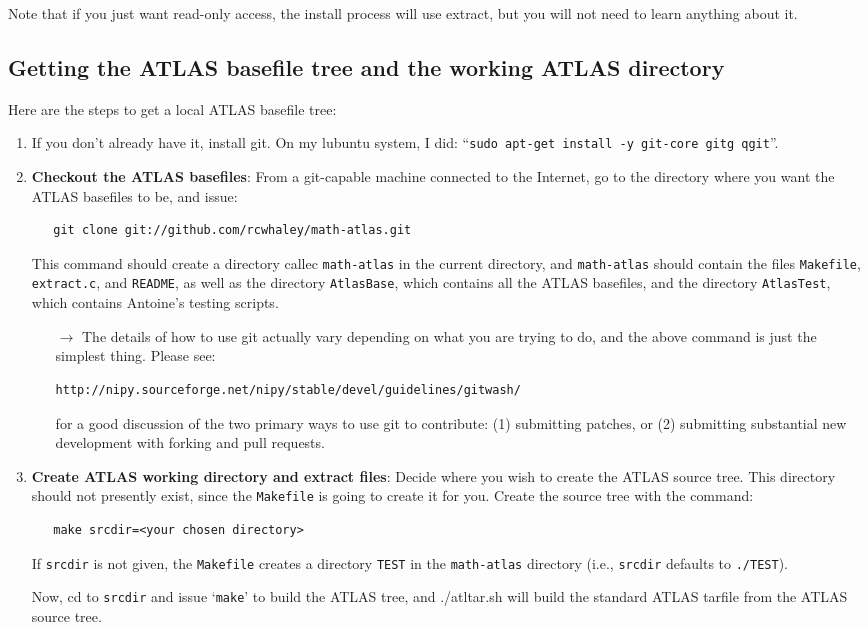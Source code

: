 \documentclass[11pt]{article}
\begin{document}
Note that if you just want read-only access, the install process will use
extract, but you will not need to learn anything about it.

\subsection{Getting the ATLAS basefile tree and the working ATLAS directory}
Here are the steps to get a local ATLAS basefile tree:
\begin{enumerate}
   \item If you don't already have it, install git.  On my lubuntu system,
         I did: ``\texttt{sudo apt-get install -y git-core gitg qgit}''.
       
\item {\bf Checkout the ATLAS basefiles}:
From a git-capable machine connected to the Internet, go to the directory
where you want the ATLAS basefiles to be, and issue:
\begin{verbatim}
   git clone git://github.com/rcwhaley/math-atlas.git
\end{verbatim}
This command should create a directory callec {\tt math-atlas} in the
current directory, and {\tt math-atlas} should contain the files
\texttt{Makefile}, \texttt{extract.c}, and \texttt{README},
as well as the directory \texttt{AtlasBase}, which contains all
the ATLAS basefiles, and the directory \texttt{AtlasTest},
which contains Antoine's testing scripts.
   \begin{itemize}
   \item [$\rightarrow$] The details of how to use git actually vary depending
      on what you are trying to do, and the above command is just the
      simplest thing.  Please see:
\begin{verbatim}
http://nipy.sourceforge.net/nipy/stable/devel/guidelines/gitwash/
\end{verbatim}
   for a good discussion of the two primary ways to use git to contribute:
   (1) submitting patches, or (2) submitting substantial new development
   with forking and pull requests.

   \end{itemize}

\item {\bf Create ATLAS working directory and extract files}:
Decide where you wish to create the ATLAS source tree.  This directory should
not presently exist, since the \texttt{Makefile} is going to create it for you.
Create the source tree with the command:
\begin{verbatim}
   make srcdir=<your chosen directory>
\end{verbatim}

If \texttt{srcdir} is not given, the \texttt{Makefile} creates a directory
\texttt{TEST} in the \texttt{math-atlas} directory (i.e., \texttt{srcdir}
defaults to \verb+./TEST+).

Now, cd to \texttt{srcdir} and issue `\texttt{make}' to build the ATLAS
tree, and {./atltar.sh} will build the standard ATLAS tarfile from the
ATLAS source tree.
\end{enumerate}
\end{document}
